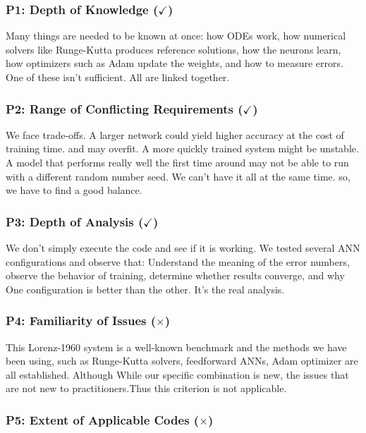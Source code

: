 \subsubsection{P1: Depth of Knowledge ($\checkmark$)}

Many things are needed to be known at once: how ODEs work, how numerical solvers like Runge-Kutta produces reference solutions, how the neurons learn, how optimizers such as Adam update the weights, and how to measure errors. One of these isn't sufficient. All are linked together.

\subsubsection{P2: Range of Conflicting Requirements ($\checkmark$)}

We face trade-offs. A larger network could yield higher accuracy at the cost of training time.
and may overfit. A more quickly trained system might be unstable. A model that performs really well the first time around may not be able to run with a different random number seed. We can't have it all at the same time. so, we have to find a good balance.


\subsubsection{P3: Depth of Analysis ($\checkmark$)}

We don't simply execute the code and see if it is working. We tested several ANN configurations and observe that: Understand the meaning of the error numbers, observe the behavior of training, determine whether results converge, and why One configuration is better than the other. It's the real analysis.

\subsubsection{P4: Familiarity of Issues ($\times$)}

This Lorenz-1960 system is a well-known benchmark and the methods we have been using, such as Runge-Kutta solvers, feedforward ANNs, Adam optimizer are all established. Although
While our specific combination is new, the issues that are not new to practitioners.Thus this criterion is not applicable.


\subsubsection{P5: Extent of Applicable Codes ($\times$)}

